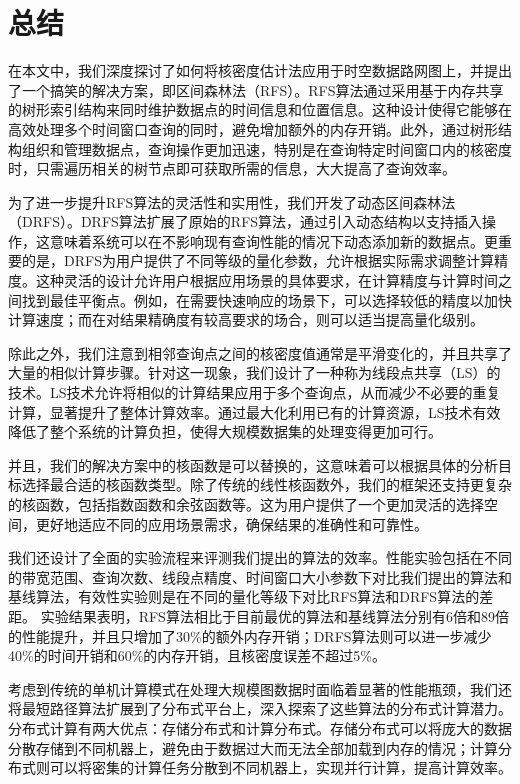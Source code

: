 \chapter{总结}

	在本文中，我们深度探讨了如何将核密度估计法应用于时空数据路网图上，并提出了一个搞笑的解决方案，即区间森林法（RFS）。RFS算法通过采用基于内存共享的树形索引结构来同时维护数据点的时间信息和位置信息。这种设计使得它能够在高效处理多个时间窗口查询的同时，避免增加额外的内存开销。此外，通过树形结构组织和管理数据点，查询操作更加迅速，特别是在查询特定时间窗口内的核密度时，只需遍历相关的树节点即可获取所需的信息，大大提高了查询效率。

	为了进一步提升RFS算法的灵活性和实用性，我们开发了动态区间森林法（DRFS）。DRFS算法扩展了原始的RFS算法，通过引入动态结构以支持插入操作，这意味着系统可以在不影响现有查询性能的情况下动态添加新的数据点。更重要的是，DRFS为用户提供了不同等级的量化参数，允许根据实际需求调整计算精度。这种灵活的设计允许用户根据应用场景的具体要求，在计算精度与计算时间之间找到最佳平衡点。例如，在需要快速响应的场景下，可以选择较低的精度以加快计算速度；而在对结果精确度有较高要求的场合，则可以适当提高量化级别。

	除此之外，我们注意到相邻查询点之间的核密度值通常是平滑变化的，并且共享了大量的相似计算步骤。针对这一现象，我们设计了一种称为线段点共享（LS）的技术。LS技术允许将相似的计算结果应用于多个查询点，从而减少不必要的重复计算，显著提升了整体计算效率。通过最大化利用已有的计算资源，LS技术有效降低了整个系统的计算负担，使得大规模数据集的处理变得更加可行。

	并且，我们的解决方案中的核函数是可以替换的，这意味着可以根据具体的分析目标选择最合适的核函数类型。除了传统的线性核函数外，我们的框架还支持更复杂的核函数，包括指数函数和余弦函数等。这为用户提供了一个更加灵活的选择空间，更好地适应不同的应用场景需求，确保结果的准确性和可靠性。
	
	我们还设计了全面的实验流程来评测我们提出的算法的效率。性能实验包括在不同的带宽范围、查询次数、线段点精度、时间窗口大小参数下对比我们提出的算法和基线算法，有效性实验则是在不同的量化等级下对比RFS算法和DRFS算法的差距。	实验结果表明，RFS算法相比于目前最优的算法和基线算法分别有6倍和89倍的性能提升，并且只增加了30\%的额外内存开销；DRFS算法则可以进一步减少40\%的时间开销和60\%的内存开销，且核密度误差不超过5\%。

	考虑到传统的单机计算模式在处理大规模图数据时面临着显著的性能瓶颈，我们还将最短路径算法扩展到了分布式平台上，深入探索了这些算法的分布式计算潜力。分布式计算有两大优点：存储分布式和计算分布式。存储分布式可以将庞大的数据分散存储到不同机器上，避免由于数据过大而无法全部加载到内存的情况；计算分布式则可以将密集的计算任务分散到不同机器上，实现并行计算，提高计算效率。

